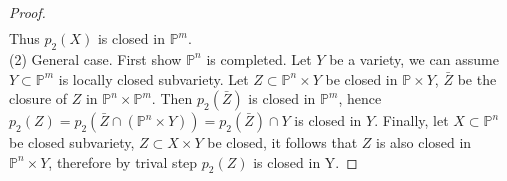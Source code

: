 \begin{proof}
\begin{align*}
	\end{align*}
	Thus $ p_2(X) $ is closed in $ \mathbb{P}^m $.\\
	(2) General case. First show $ \mathbb{P}^n $ is completed. Let $ Y $ be a variety, we can assume $ Y\subset \mathbb{P}^m $ is locally closed subvariety. Let $ Z\subset \mathbb{P}^n\times Y $ be closed in $ \mathbb{P}\times Y $, $ \bar{Z} $ be the closure of $ Z $ in $ \mathbb{P}^n\times\mathbb{P}^m $. Then $ p_2(\bar{Z}) $ is closed in $ \mathbb{P}^m $, hence $ p_2(Z)=p_2(\bar{Z}\cap (\mathbb{P}^n\times Y))=p_2(\bar{Z})\cap Y $ is closed in $ Y $. Finally, let $ X\subset \mathbb{P}^n $ be closed subvariety, $ Z\subset X\times Y $  be closed, it follows that $ Z $ is also closed in $ \mathbb{P}^n\times Y $, therefore by trival step $ p_2(Z) $ is closed in Y.
\end{proof}

